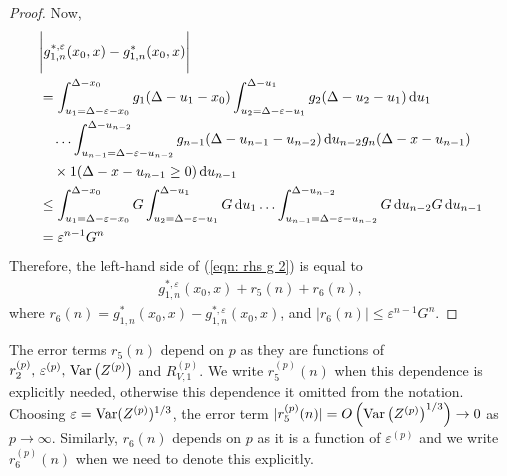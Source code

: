 \begin{proof}
	Now, 
	\begin{align*}
		&\Bigg|g_{1,n}^{*,\varepsilon}(x_0,x) - g_{1,n}^{*}(x_0,x)
		\Bigg|\nonumber
		\\&= \int_{u_1=\Delta-\varepsilon-x_0}^{\Delta-x_0}g_1(\Delta - u_1 - x_0)
		\int_{u_2=\Delta-\varepsilon-u_1}^{\Delta-u_1}g_2(\Delta - u_2 - u_1)\, \mathrm{d} u_1  \nonumber 
		\\&\quad\hdots 
            	\int_{u_{n-1}=\Delta-\varepsilon-u_{n-2}}^{\Delta-u_{n-2}} g_{n-1}(\Delta - u_{n-1} - u_{n-2}) \, \mathrm{d} u_{n-2}
            	g_{n}(\Delta - x-u_{n-1})\nonumber 
		\\&\quad\times 1(\Delta - x-u_{n-1}\geq 0)\, \mathrm{d} u_{n-1}\nonumber
		\\&\leq \int_{u_1=\Delta-\varepsilon-x_0}^{\Delta-x_0}G 
		\int_{u_2=\Delta-\varepsilon-u_1}^{\Delta-u_1}G \, \mathrm{d} u_1  \hdots 
            	\int_{u_{n-1}=\Delta-\varepsilon-u_{n-2}}^{\Delta-u_{n-2}} G \, \mathrm{d} u_{n-2}\nonumber
            	G\, \mathrm{d} u_{n-1} 
		\\& = \varepsilon^{n-1}G ^n 
	\end{align*}
	Therefore, the left-hand side of (\ref{eqn: rhs g 2}) is equal to 
	\begin{align*}
		g^{*,\varepsilon}_{1,n}(x_0,x) + r_5(n) + r_6(n),
	\end{align*}
	where \(r_6(n) = g_{1,n}^{*}(x_0,x) - g_{1,n}^{*,\varepsilon}(x_0,x) \), and \(|r_6(n)|\leq \varepsilon^{n-1}G ^n\).
\end{proof}

The error terms \(r_5(n)\) depend on \(p\) as they are functions of \(r_2^{(p)},\, \varepsilon^{(p)},\, \mathrm{Var}\left(Z^{(p)}\right)\) and \(R_{V,1}^{(p)}\). We write \(r_5^{(p)}(n)\) when this dependence is explicitly needed, otherwise this dependence it omitted from the notation. Choosing \(\varepsilon = \mathrm{Var}(Z^{(p)})^{1/3}\), the error term \(|r_5^{(p)}(n)|= O\left(\mathrm{Var}\left(Z^{(p)}\right)^{1/3}\right)\to 0\) as \(p\to\infty\). Similarly, \(r_6(n)\) depends on \(p\) as it is a function of \(\varepsilon^{(p)}\) and we write \(r_6^{(p)}(n)\) when we need to denote this explicitly. 

